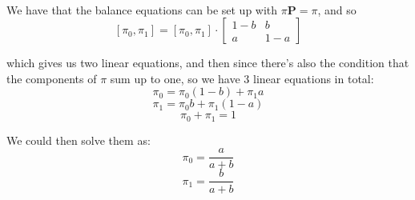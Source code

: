 \documentclass{article}
\begin{document}
 \\

We have that the balance equations can be set up with $\pi\mathbf{P} = \pi$, and so
$$[\pi_0, \pi_1] = [\pi_0, \pi_1] \cdot
\begin{bmatrix}
	1-b & b \\
	a & 1-a
\end{bmatrix}$$

which gives us two linear equations, and then since there's also the condition that the components of $\pi$ sum up to one, so we have 3 linear equations in total:
$$\pi_0 = \pi_0 (1-b) + \pi_1 a$$
$$\pi_1 = \pi_0 b + \pi_1 (1-a)$$
$$\pi_0 + \pi_1 = 1$$

We could then solve them as:
$$\pi_0 = \frac{a}{a+b}$$
$$\pi_1 = \frac{b}{a+b}$$
\end{document}
